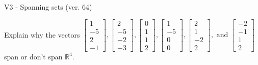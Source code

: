 \begin{exercise}
  \begin{exerciseTitle}V3 - Spanning sets (ver. 64)\end{exerciseTitle}
  \begin{exerciseStatement}
    Explain why the vectors \(\left[\begin{array}{r}
1 \\
-5 \\
2 \\
-1
\end{array}\right] , \left[\begin{array}{r}
2 \\
-5 \\
-2 \\
-3
\end{array}\right] , \left[\begin{array}{r}
0 \\
1 \\
1 \\
2
\end{array}\right] , \left[\begin{array}{r}
1 \\
-5 \\
0 \\
0
\end{array}\right] , \left[\begin{array}{r}
2 \\
1 \\
-2 \\
2
\end{array}\right] , \text{ and } \left[\begin{array}{r}
-2 \\
-1 \\
1 \\
2
\end{array}\right]\) span or don't span \(\mathbb{R}^4\). 
	



\end{exerciseStatement}
\end{exercise}
